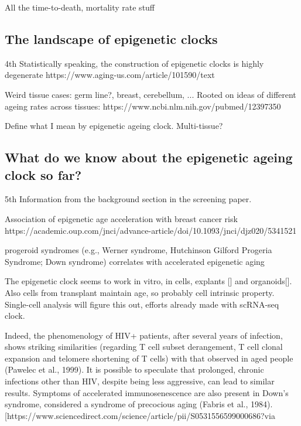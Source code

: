 All the time-to-death, mortality rate stuff


\subsection{The landscape of epigenetic clocks}

4th
Statistically speaking, the construction of epigenetic clocks is highly degenerate
https://www.aging-us.com/article/101590/text

Weird tissue cases: germ line?, breast, cerebellum, ...
Rooted on ideas of different ageing rates across tissues:
https://www.ncbi.nlm.nih.gov/pubmed/12397350

Define what I mean by epigenetic ageing clock. Multi-tissue? 


\subsection{What do we know about the epigenetic ageing clock so far?}

5th
Information from the background section in the screening paper.

Association of epigenetic age acceleration with breast cancer risk https://academic.oup.com/jnci/advance-article/doi/10.1093/jnci/djz020/5341521

progeroid syndromes (e.g., Werner syndrome, Hutchinson Gilford Progeria Syndrome; Down syndrome) correlates with accelerated epigenetic aging

The epigenetic clock seems to work in vitro, in cells, explants [] and organoids[]. Also cells from transplant maintain age, so probably cell intrinsic property. Single-cell analysis will figure this out, efforts already made with scRNA-seq clock.


Indeed, the phenomenology of HIV+ patients, after several years of infection, shows striking similarities (regarding T cell subset derangement, T cell clonal expansion and telomere shortening of T cells) with that observed in aged people (Pawelec et al., 1999). It is possible to speculate that prolonged, chronic infections other than HIV, despite being less aggressive, can lead to similar results. Symptoms of accelerated immunosenescence are also present in Down’s syndrome, considered a syndrome of precocious aging (Fabris et al., 1984). [https://www.sciencedirect.com/science/article/pii/S0531556599000686?via%

